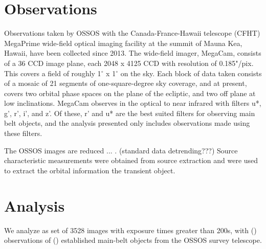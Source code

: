 \documentclass[iop,apj]{emulateapj}
\begin{document}

\section{Observations}

Observations taken by OSSOS with the Canada-France-Hawaii telescope (CFHT) MegaPrime wide-field optical imaging facility  at the summit of Mauna Kea, Hawaii, have been collected since 2013. The wide-field imager, MegaCam, consists of a 36 CCD image plane, each 2048 x 4125 CCD with resolution of 0.185"/pix. This covers a field of  roughly 1$^{\circ}$ x 1$^{\circ}$ on the sky. Each block of data taken consists of a mosaic of 21 segments of one-square-degree sky coverage, and at present, covers two orbital phase spaces on the plane of the ecliptic, and two off plane at low inclinations. MegaCam observes in the optical to near infrared with filters u*, g', r', i', and z'. Of these, r' and u* are the best suited filters for observing main belt objects, and the analysis presented only includes observations made using these filters. 

The OSSOS images are reduced ... . (standard data detrending???) Source characteristic measurements were obtained from source extraction  and were used to extract the orbital information the transient object. 



\section{Analysis}

We analyze as set of 3528 images with exposure times greater than 200s, with () observations of () established main-belt objects from the OSSOS survey telescope. 
\end{document}
